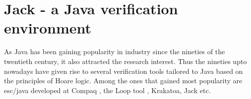 \section{Jack - a Java verification environment} \label{javaVerif:jack} 
As Java has been gaining popularity in industry since the nineties of the twentieth century,
it also attracted the research interest.   
Thus the nineties upto nowadays have given rise to several verification tools tailored to Java
 based on the principles of Hoare logic. Among the ones that gained most popularity are
esc/java developed at Compaq \cite{escjava}, the Loop tool \cite{jacobs03java}, Krakatoa, Jack \cite{BRL-JACK} etc.
